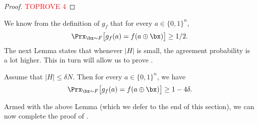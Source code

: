 \documentclass[11pt]{article}
\theoremstyle{definition}
\begin{document}
\begin{proof}\textcolor{red}{TOPROVE 4}\end{proof}






We know from the definition of $g_f$ that for every $a \in \{0,1\}^n$, $$\Prx_{\bx \sim F} \big[g_f(a)=f(a \oplus \bx)\big] \geq 1/2.$$
The next Lemma states that whenever $|H|$ is small, the agreement probability is a lot higher. This in turn will allow us to prove . 


\begin{lemma} 
\label{lem:amplification}
    Assume that $|H| \leq \delta N$. Then for every $a \in \{0,1\}^n$,  we have  
    $$\Prx_{\bx \sim F}\big[g_f(a) = f(a \oplus \bx)\big] \geq 1- 4 \delta.$$
\end{lemma}

Armed with the above Lemma (which we defer to the end of this section), we can now complete the proof of  .
\end{document}
